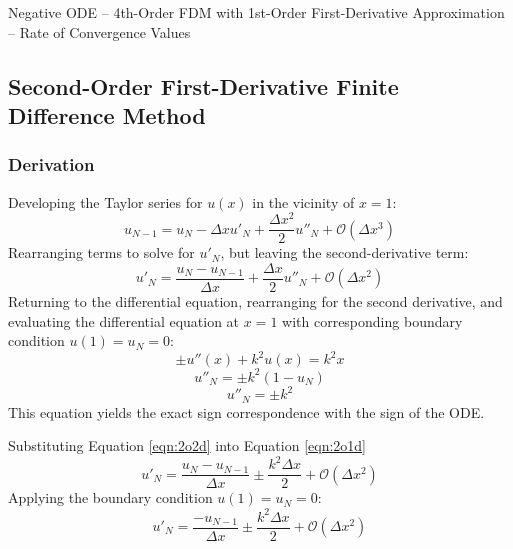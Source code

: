 \documentclass[10pt, reqno]{article}		%
\numberwithin{equation}{section}
\begin{document}
\vfill

\begin{table}[H]
	
	\caption{Negative ODE -- 4th-Order FDM with 1st-Order First-Derivative Approximation -- Rate of Convergence Values}	
\end{table}

\newpage

\subsection{Second-Order First-Derivative Finite Difference Method}

\subsubsection{Derivation}

Developing the Taylor series for $u(x)$ in the vicinity of $x = 1$:
\begin{equation}
u_{N-1} = u_N - \Delta x u'_N + \frac{\Delta x^2}{2} u''_N + \mathcal{O}(\Delta x^3)
\end{equation}
Rearranging terms to solve for $u'_N$, but leaving the second-derivative term:
\begin{equation}
\label{eqn:2o1d}
u'_N = \frac{u_N - u_{N-1}}{\Delta x} + \frac{\Delta x}{2} u''_N + \mathcal{O}(\Delta x^2)
\end{equation}
Returning to the differential equation, rearranging for the second derivative, and evaluating the differential equation at $x = 1$ with corresponding boundary condition $u(1) = u_N = 0$:
\begin{equation}
\pm u''(x)+k^2u(x)=k^2x
\end{equation}
\begin{equation}
u''_N = \pm k^2(1-u_N)
\end{equation}
\begin{equation}
\label{eqn:2o2d}
u''_N = \pm k^2
\end{equation}
This equation yields the exact sign correspondence with the sign of the ODE.

Substituting Equation \ref{eqn:2o2d} into Equation \ref{eqn:2o1d}
\begin{equation}
u'_N = \frac{u_N - u_{N-1}}{\Delta x} \pm \frac{k^2 \Delta x}{2} + \mathcal{O}(\Delta x^2)
\end{equation}
Applying the boundary condition $u(1) = u_N = 0$:
\begin{equation}
u'_N = \frac{-u_{N-1}}{\Delta x} \pm \frac{k^2 \Delta x}{2} + \mathcal{O}(\Delta x^2)
\end{equation}
\end{document}
